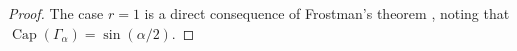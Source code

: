 \documentclass[12pt,oneside,reqno]{amsart}
\theoremstyle{definition}
\numberwithin{equation}{section}
\newcommand{\C}{{\mathbb C}}
\renewcommand{\Cap}{\operatorname{Cap}}
\begin{document}
\begin{proof}
%
The case $r=1$ is a direct consequence of Frostman's theorem \cite[Theorem 3.3.4]{ransford95}, noting that $\Cap(\Gamma_\alpha) = \sin(\alpha/2)$. %


\end{proof}
\end{document}

